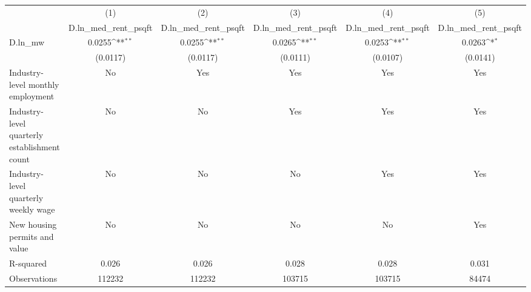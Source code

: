 {
\def\sym#1{\ifmmode^{#1}\else\(^{#1}\)\fi}
\begin{tabular}{l*{5}{c}}
\hline\hline
          &\multicolumn{1}{c}{(1)}&\multicolumn{1}{c}{(2)}&\multicolumn{1}{c}{(3)}&\multicolumn{1}{c}{(4)}&\multicolumn{1}{c}{(5)}\\
          &\multicolumn{1}{c}{D.ln\_med\_rent\_psqft}&\multicolumn{1}{c}{D.ln\_med\_rent\_psqft}&\multicolumn{1}{c}{D.ln\_med\_rent\_psqft}&\multicolumn{1}{c}{D.ln\_med\_rent\_psqft}&\multicolumn{1}{c}{D.ln\_med\_rent\_psqft}\\
\hline
D.ln\_mw   &   0.0255\sym{**} &   0.0255\sym{**} &   0.0265\sym{**} &   0.0253\sym{**} &   0.0263\sym{*}  \\
          & (0.0117)         & (0.0117)         & (0.0111)         & (0.0107)         & (0.0141)         \\
\hline
Industry-level monthly employment&       No         &      Yes         &      Yes         &      Yes         &      Yes         \\
Industry-level quarterly establishment count&       No         &       No         &      Yes         &      Yes         &      Yes         \\
Industry-level quarterly weekly wage&       No         &       No         &       No         &      Yes         &      Yes         \\
New housing permits and value&       No         &       No         &       No         &       No         &      Yes         \\
R-squared &    0.026         &    0.026         &    0.028         &    0.028         &    0.031         \\
Observations&   112232         &   112232         &   103715         &   103715         &    84474         \\
\hline\hline
\end{tabular}
}
